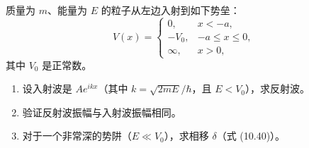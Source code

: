 \begin{question}
质量为 $m$、能量为 $E$ 的粒子从左边入射到如下势垒：
\[
V(x)=\begin{cases}
0,&x<-a,\\
-V_0,&-a\le x\le 0,\\
\infty,&x>0,
\end{cases}
\]
其中 $V_0$ 是正常数。
\begin{enumerate}
\item 设入射波是 $Ae^{ikx}$（其中 $k=\sqrt{2mE}/\hbar$，且 $E<V_0$），求反射波。
\item 验证反射波振幅与入射波振幅相同。
\item 对于一个非常深的势阱（$E\ll V_0$），求相移 $\delta$（式 (10.40)）。
\end{enumerate}

\par\smallskip
{}

\end{question}
